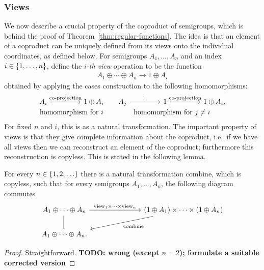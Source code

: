 \subsubsection{Views}
\label{sec:views}
We now describe a crucial property of the coproduct of semigroups, which is behind the proof of Theorem~\ref{thm:regular-functions}. The idea is that an element of a coproduct can be uniquely defined from its views onto the individual coordinates, as defined below. 
For semigroups $A_1,\ldots,A_n$ and an index $i \in \{1,\ldots,n\}$, define the \emph{$i$-th view} operation to be the function 
\begin{align*}
A_1 \oplus \cdots \oplus A_n \to 1 \oplus A_i
\end{align*}
 obtained by applying the cases construction to the following  homomorphisms:
\[
    \begin{tabular}{cc}
\begin{tikzcd}
    [column sep=1.5cm]
    A_i 
    \ar[r,"\text{co-projection}"] 
    &
    1 \oplus A_i
    \end{tikzcd}
&
\begin{tikzcd}
    [column sep=1.5cm]
A_j 
\ar[r,"!"]
&
1
\ar[r,"\text{co-projection}"] 
&
1 \oplus A_i.
\end{tikzcd}\\
\text{homomorphism for $i$}
&
\text{homomorphism for $j\neq i$}
\end{tabular}
\]
For fixed $n$ and $i$, this is  as a natural transformation. The important property of views is that they give complete information about the coproduct, i.e.~if we have all views then we can reconstruct an element of the coproduct; furthermore this reconstruction is copyless. This is stated in the following lemma. 

\newcommand{\combine}{\mathrm{combine}}
\newcommand{\view}{\mathrm{view}}
\begin{lemma}
\label{lem:views}
    For every $n \in \{1,2,\ldots\}$ there is a natural transformation $\combine$, which is copyless, such that for every semigroups $A_1,\ldots,A_n$, the following diagram commutes 
\[
\begin{tikzcd}
    [column sep=2.5cm]
A_1 \oplus \cdots \oplus A_n 
\ar[d,equal]
\ar[r,"\view_1 \times \cdots \times \view_n"]
&
(1 \oplus A_1) \times \cdots \times (1 \oplus A_n)
\ar[dl,"\combine"]
\\
A_1 \oplus \cdots \oplus A_n.
\end{tikzcd}
\]
\end{lemma}
\begin{proof}
    Straightforward. \textbf{TODO: wrong (except $n=2$); formulate a suitable corrected version}
\end{proof}

